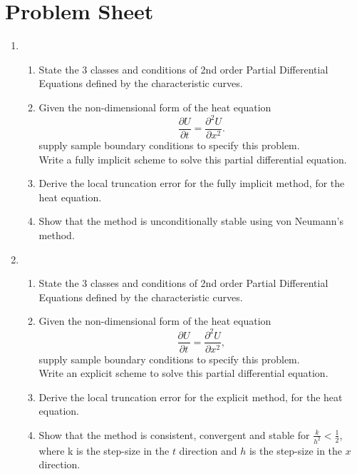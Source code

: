 \newpage
\chapter*{Problem Sheet}
\begin{enumerate}
\item
	\begin{enumerate}
		\item
		State the 3 classes and conditions of 2nd order Partial Differential Equations defined by the characteristic curves.
		
		\item
		Given the non-dimensional form of the heat equation
		\[\frac{\partial U}{\partial t} = \frac{\partial^2 U}{\partial x^2}.\]
		supply sample boundary conditions to specify this problem.\\
		Write a fully implicit scheme to solve this partial differential equation.
		\item
		Derive the local truncation error for the fully implicit method, for the heat equation.
		\item
		Show that the method is unconditionally stable using von Neumann's method.
		

	\end{enumerate}

\item

	\begin{enumerate}
		\item
		State the 3 classes and conditions of 2nd order Partial Differential Equations defined by the characteristic curves.
		\item
		Given the non-dimensional form of the heat equation
		\[\frac{\partial U}{\partial t} = \frac{\partial^2 U}{\partial x^2},\]
		supply sample boundary conditions to specify this problem.\\
		Write an explicit scheme to solve this partial differential equation.
		\item
		Derive the local truncation error for the explicit method, for the heat equation.\\
						
		\item
		Show that the method is consistent, convergent and stable for $\frac{k}{h^2}<\frac{1}{2}$, where k is the step-size in the $t$ direction and $h$ is the step-size
		in the $x$ direction.
		

\end{enumerate}
\end{enumerate}
